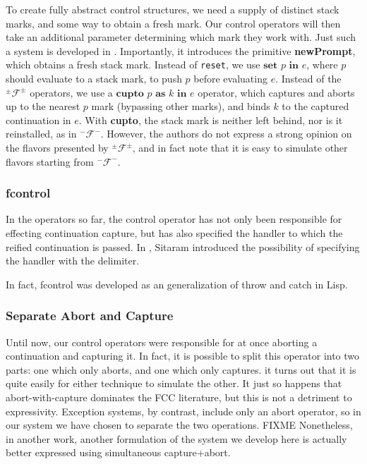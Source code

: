 \documentclass[11pt]{article}
\newcommand\F{\mathcal{F}}
\newcommand\pmFpm{^\pm\F^\pm}
\begin{document}
To create fully abstract control structures, we need a supply of distinct stack marks, and some way to obtain a fresh mark.
Our control operators will then take an additional parameter determining which mark they work with.
Just such a system is developed in \cite{Gunter:1995}.
Importantly, it introduces the primitive \textbf{newPrompt}, which obtains a fresh stack mark.
Instead of \texttt{reset}, we use $\textbf{set }p\textbf{ in }e$, where $p$ should evaluate to a stack mark, to push $p$ before evaluating $e$.
Instead of the $\pmFpm$ operators, we use a $\textbf{cupto }p\textbf{ as }k\textbf{ in }e$ operator, which captures and aborts up to the nearest $p$ mark (bypassing other marks), and binds $k$ to the captured continuation in $e$.
With \textbf{cupto}, the stack mark is neither left behind, nor is it reinstalled, as in $^-\mathcal{F}^-$.
However, the authors do not express a strong opinion on the flavors presented by $\pmFpm$, and in fact note that it is easy to simulate other flavors starting from $^-\mathcal{F}^-$.

\subsubsection{fcontrol}

In the operators so far, the control operator has not only been responsible for effecting continuation capture, but has also specified the handler to which the reified continuation is passed.
In \cite{HandlingControl}, Sitaram introduced the possibility of specifying the handler with the delimiter.


In fact, fcontrol was developed as an generalization of throw and catch in Lisp.

\subsubsection{Separate Abort and Capture}

Until now, our control operators were responsible for at once aborting a continuation and capturing it.
In fact, it is possible to split this operator into two parts: one which only aborts, and one which only captures.
it turns out that it is quite easily for either technique to simulate the other.\cite{MFDC}
It just so happens that abort-with-capture dominates the FCC literature, but this is not a detriment to expressivity.
Exception systems, by contrast, include only an abort operator, so in our system we have chosen to separate the two operations.
FIXME Nonetheless, in another work, another formulation of the system we develop here is actually better expressed using simultaneous capture+abort.
\end{document}
